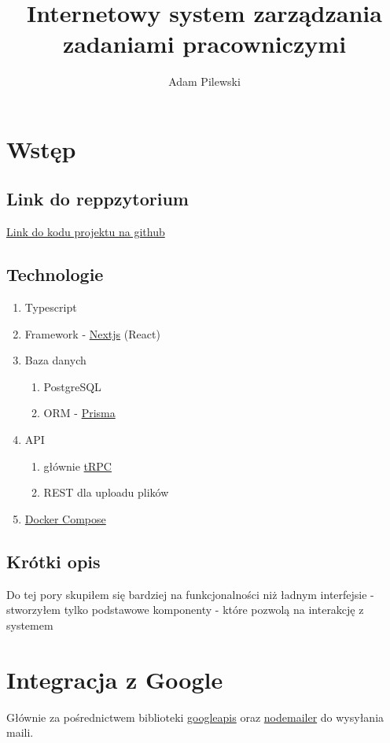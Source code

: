 \documentclass[a4paper, 12pt]{article}
\title{Internetowy system zarządzania zadaniami pracowniczymi}
\author{Adam Pilewski}
\begin{document}
\maketitle
\tableofcontents
\section{Wstęp}
\subsection{Link do reppzytorium}
\href{https://github.com/adas77/workflow}{Link do kodu projektu na github}
\subsection{Technologie}
\begin{enumerate}
    \item Typescript
    \item Framework - \href{https://nextjs.org/}{Nextjs} (React)
    \item Baza danych \begin{enumerate}
        \item PostgreSQL
        \item ORM - \href{https://www.prisma.io/}{Prisma}
    \end{enumerate}
    \item API \begin{enumerate}
        \item głównie \href{https://trpc.io/}{tRPC}
        \item REST dla uploadu plików
    \end{enumerate}
    \item \href{https://docs.docker.com/compose/}{Docker Compose}
\end{enumerate}
\subsection{Krótki opis}
Do tej pory skupiłem się bardziej na funkcjonalności niż ładnym interfejsie - stworzyłem tylko podstawowe komponenty - które pozwolą na interakcję z systemem

\pagebreak

\section{Integracja z Google}
Głównie za pośrednictwem biblioteki \href{https://www.npmjs.com/package/googleapis}{googleapis} oraz \href{https://www.npmjs.com/package/nodemailer}{nodemailer} do wysyłania maili.
\end{document}
